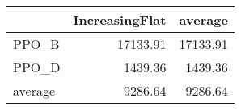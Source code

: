\begin{tabular}{lrr}
\toprule
{} &  IncreasingFlat &   average \\
\midrule
PPO\_B   &        17133.91 &  17133.91 \\
PPO\_D   &         1439.36 &   1439.36 \\
average &         9286.64 &   9286.64 \\
\bottomrule
\end{tabular}
